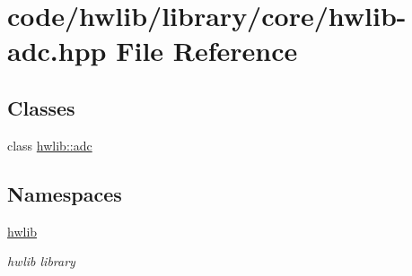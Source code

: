 \hypertarget{hwlib-adc_8hpp}{}\section{code/hwlib/library/core/hwlib-\/adc.hpp File Reference}
\label{hwlib-adc_8hpp}
\subsection*{Classes}
\begin{DoxyCompactItemize}
\item 
class \hyperlink{classhwlib_1_1adc}{hwlib\+::adc}
\end{DoxyCompactItemize}
\subsection*{Namespaces}
\begin{DoxyCompactItemize}
\item 
 \hyperlink{namespacehwlib}{hwlib}
\begin{DoxyCompactList}\small\item\em hwlib library \end{DoxyCompactList}\end{DoxyCompactItemize}
